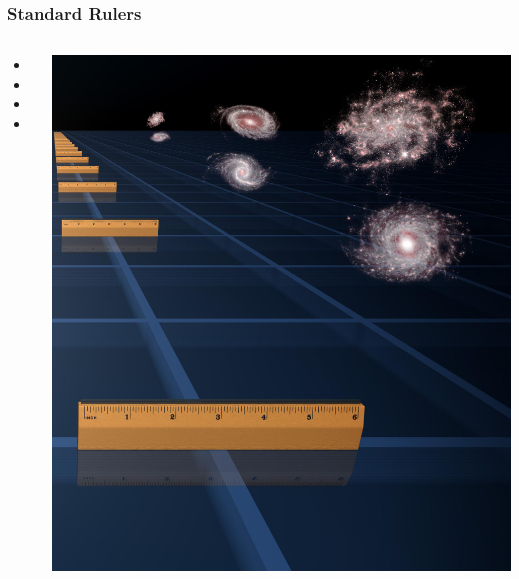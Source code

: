 \documentclass[aspectratio=169]{beamer}
\begin{document}
\begin{frame}
    \frametitle{Standard Rulers}
    \begin{columns}
        \begin{itemize}
            \item <+CMB+>
            \item <+BAO+>
            \item <+Strong lensing+>
            \item <+Weak lensing+>
        \end{itemize}
        \includegraphics[width=\textwidth]{figures/rulers.jpg}
    \end{columns}
\end{frame}
\end{document}
